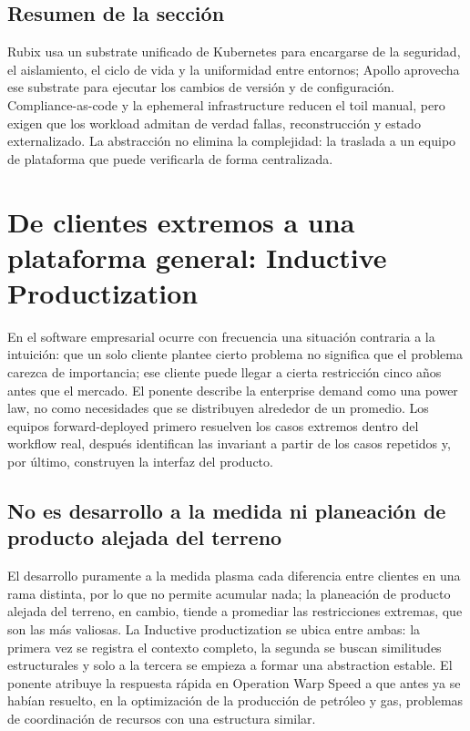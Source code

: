 \documentclass[a4paper]{article}
\begin{document}
\subsection{Resumen de la sección}

Rubix usa un substrate unificado de Kubernetes para encargarse de la seguridad, el aislamiento, el ciclo de vida y la uniformidad entre entornos; Apollo aprovecha ese substrate para ejecutar los cambios de versión y de configuración. Compliance-as-code y la ephemeral infrastructure reducen el toil manual, pero exigen que los workload admitan de verdad fallas, reconstrucción y estado externalizado. La abstracción no elimina la complejidad: la traslada a un equipo de plataforma que puede verificarla de forma centralizada.
\section{De clientes extremos a una plataforma general: Inductive Productization}

En el software empresarial ocurre con frecuencia una situación contraria a la intuición: que un solo cliente plantee cierto problema no significa que el problema carezca de importancia; ese cliente puede llegar a cierta restricción cinco años antes que el mercado. El ponente describe la enterprise demand como una power law, no como necesidades que se distribuyen alrededor de un promedio. Los equipos forward-deployed primero resuelven los casos extremos dentro del workflow real, después identifican las invariant a partir de los casos repetidos y, por último, construyen la interfaz del producto.

\subsection{No es desarrollo a la medida ni planeación de producto alejada del terreno}

El desarrollo puramente a la medida plasma cada diferencia entre clientes en una rama distinta, por lo que no permite acumular nada; la planeación de producto alejada del terreno, en cambio, tiende a promediar las restricciones extremas, que son las más valiosas. La Inductive productization se ubica entre ambas: la primera vez se registra el contexto completo, la segunda se buscan similitudes estructurales y solo a la tercera se empieza a formar una abstraction estable. El ponente atribuye la respuesta rápida en Operation Warp Speed a que antes ya se habían resuelto, en la optimización de la producción de petróleo y gas, problemas de coordinación de recursos con una estructura similar.
\end{document}
